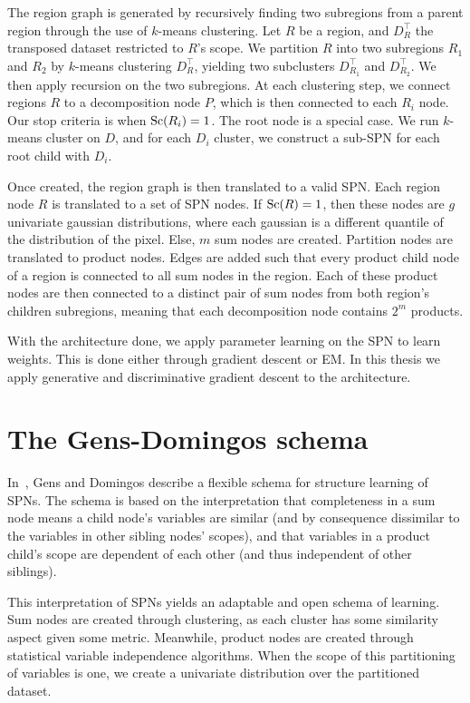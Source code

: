 The region graph is generated by recursively finding two subregions from a parent region through
the use of $k$-means clustering. Let $R$ be a region, and $D_R^\intercal$ the transposed dataset
restricted to $R$'s scope. We partition $R$ into two subregions $R_1$ and $R_2$ by $k$-means
clustering $D_R^\intercal$, yielding two subclusters $D_{R_1}^\intercal$ and $D_{R_2}^\intercal$.
We then apply recursion on the two subregions. At each clustering step, we connect regions $R$ to a
decomposition node $P$, which is then connected to each $R_i$ node. Our stop criteria is when
$\operatorname*{\text{Sc}}(R_i)=1$. The root node is a special case. We run $k$-means cluster on $D$, and for each
$D_i$ cluster, we construct a sub-SPN for each root child with $D_i$.

Once created, the region graph is then translated to a valid SPN\@. Each region node $R$ is
translated to a set of SPN nodes. If $\operatorname*{\text{Sc}}(R)=1$, then these nodes are $g$ univariate gaussian
distributions, where each gaussian is a different quantile of the distribution of the pixel. Else,
$m$ sum nodes are created. Partition nodes are translated to product nodes. Edges are added such
that every product child node of a region is connected to all sum nodes in the region. Each of
these product nodes are then connected to a distinct pair of sum nodes from both region's children
subregions, meaning that each decomposition node contains $2^m$ products.

With the architecture done, we apply parameter learning on the SPN to learn weights. This is done
either through gradient descent or EM\@. In this thesis we apply generative and discriminative
gradient descent to the architecture.

\section{The Gens-Domingos schema}\label{section:gd}

In~\cite{gens-domingos}, Gens and Domingos describe a flexible schema for structure learning of
SPNs. The schema is based on the interpretation that completeness in a sum node means a child
node's variables are similar (and by consequence dissimilar to the variables in other sibling
nodes' scopes), and that variables in a product child's scope are dependent of each other (and thus
independent of other siblings).

This interpretation of SPNs yields an adaptable and open schema of learning. Sum nodes are created
through clustering, as each cluster has some similarity aspect given some metric. Meanwhile,
product nodes are created through statistical variable independence algorithms. When the scope of
this partitioning of variables is one, we create a univariate distribution over the partitioned
dataset.

